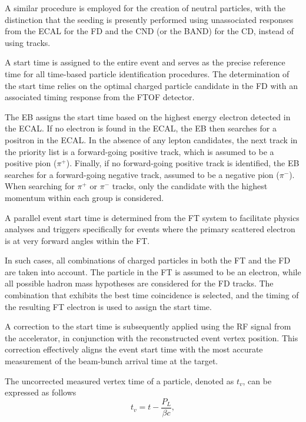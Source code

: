     A similar procedure is employed for the creation of neutral particles, with the distinction that the seeding is presently performed using unassociated responses from the ECAL for the FD and the CND (or the BAND) for the CD, instead of using tracks.

    A start time is assigned to the entire event and serves as the precise reference time for all time-based particle identification procedures.
    The determination of the start time relies on the optimal charged particle candidate in the FD with an associated timing response from the FTOF detector.

    The EB assigns the start time based on the highest energy electron detected in the ECAL.
    If no electron is found in the ECAL, the EB then searches for a positron in the ECAL.
    In the absence of any lepton candidates, the next track in the priority list is a forward-going positive track, which is assumed to be a positive pion ($\pi^+$).
    Finally, if no forward-going positive track is identified, the EB searches for a forward-going negative track, assumed to be a negative pion ($\pi^-$).
    When searching for $\pi^+$ or $\pi^-$ tracks, only the candidate with the highest momentum within each group is considered.

    A parallel event start time is determined from the FT system to facilitate physics analyses and triggers specifically for events where the primary scattered electron is at very forward angles within the FT.

    In such cases, all combinations of charged particles in both the FT and the FD are taken into account.
    The particle in the FT is assumed to be an electron, while all possible hadron mass hypotheses are considered for the FD tracks.
    The combination that exhibits the best time coincidence is selected, and the timing of the resulting FT electron is used to assign the start time.

    A correction to the start time is subsequently applied using the RF signal from the accelerator, in conjunction with the reconstructed event vertex position.
    This correction effectively aligns the event start time with the most accurate measurement of the beam-bunch arrival time at the target.

    The uncorrected measured vertex time of a particle, denoted as $t_v$, can be expressed as follows
    \begin{equation*}
        t_v = t - \frac{P_L}{\beta c},
    \end{equation*}

